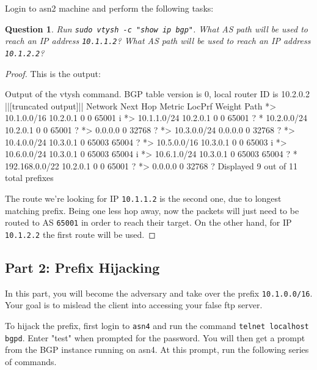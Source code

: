\documentclass[a4paper,11pt,hidelinks]{article}
\newtheorem{theorem}{Question}[subsection]
\begin{document}
Login to asn2 machine and perform the following tasks:

\begin{theorem}
    Run \verb=sudo vtysh -c "show ip bgp"=. What AS path will be used to reach an IP address \verb=10.1.1.2=? What AS path will be used to reach an IP address \verb=10.1.2.2=?
\end{theorem}

\begin{proof}
    This is the output:

\begin{code}{Output of the vtysh command.}
BGP table version is 0, local router ID is 10.2.0.2
||[truncated output]||
   Network          Next Hop            Metric LocPrf Weight Path
*> 10.1.0.0/16      10.2.0.1                 0             0 65001 i
*> 10.1.1.0/24      10.2.0.1                 0             0 65001 ?
*  10.2.0.0/24      10.2.0.1                 0             0 65001 ?
*>                  0.0.0.0                  0         32768 ?
*> 10.3.0.0/24      0.0.0.0                  0         32768 ?
*> 10.4.0.0/24      10.3.0.1                               0 65003 65004 ?
*> 10.5.0.0/16      10.3.0.1                 0             0 65003 i
*> 10.6.0.0/24      10.3.0.1                               0 65003 65004 i
*> 10.6.1.0/24      10.3.0.1                               0 65003 65004 ?
*  192.168.0.0/22   10.2.0.1                 0             0 65001 ?
*>                  0.0.0.0                  0         32768 ?
Displayed  9 out of 11 total prefixes
\end{code}

    The route we're looking for IP \verb=10.1.1.2= is the second one, due to longest matching prefix. Being one less hop away, now the packets will just need to be routed to AS \verb=65001= in order to reach their target. On the other hand, for IP \verb=10.1.2.2= the first route will be used.
\end{proof}

\clearpage
\newpage
\subsection{Part 2: Prefix Hijacking}

In this part, you will become the adversary and take over the prefix \verb=10.1.0.0/16=. Your goal is to mislead the client into accessing your false ftp server. 

To hijack the prefix, first login to \verb=asn4= and run the command \verb=telnet localhost bgpd=. Enter "test" when prompted for the password. You will then get a prompt from the BGP instance running on asn4. At this prompt, run the following series of commands.
\end{document}
